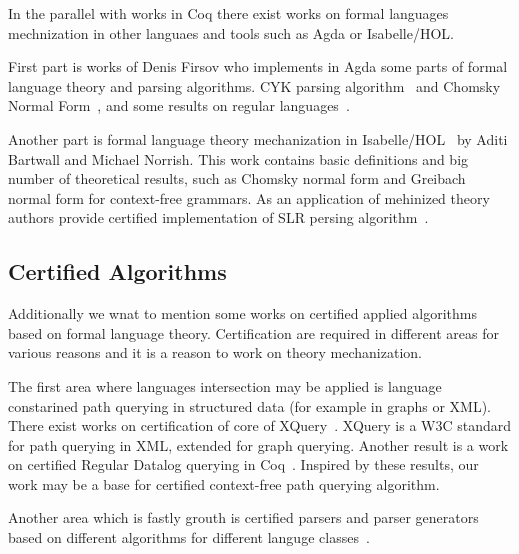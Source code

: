 In the parallel with works in Coq there exist works on formal languages mechnization in other languaes and tools such as Agda or Isabelle/HOL.

First part is works of Denis Firsov who implements in Agda some parts of formal language theory and parsing algorithms.
CYK parsing algorithm~\cite{firsov2014certified,firsov2016cfl} and Chomsky Normal Form~\cite{firsov2015certified}, and some results on regular languages~\cite{10.1007/978-3-319-03545-1_7}.

Another part is formal language theory mechanization in Isabelle/HOL~\cite{1885-16399,barthwal2010formalisation,10.1007/978-3-642-13824-9_11} by Aditi Bartwall and Michael Norrish.
This work contains basic definitions and big number of theoretical results, such as Chomsky normal form and Greibach normal form for context-free grammars. 
As an application of mehinized theory authors provide certified implementation of SLR persing algorithm~\cite{10.1007/978-3-642-00590-9_12}.

\subsection{Certified Algorithms}

Additionally we wnat to mention some works on certified applied algorithms based on formal language theory.
Certification are required in different areas for various reasons and it is a reason to work on theory mechanization.

The first area where languages intersection may be applied is language constarined path querying in structured data (for example in graphs or XML).
There exist works on certification of core of XQuery~\cite{10.1007/978-3-642-25379-9_21}. 
XQuery is a W3C standard for path querying in XML, extended for graph querying. 
Another result is a work on certified Regular Datalog querying in Coq~\cite{certifiedPrologGraphQuerying}. 
Inspired by these results, our work may be a base for certified context-free path querying algorithm.

Another area which is fastly grouth is certified parsers and parser generators based on different algorithms for different languge classes~\cite{bernardy2016certified,Lopes2016CertifiedDP,Gross2015ParsingPA}. 
